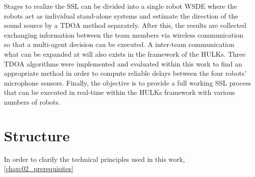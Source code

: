 Stages to realize the \ac{SSL} can be divided into a single robot \ac{WSDE} where
the robots act as individual stand-alone systems and estimate the direction of the
sound source by a \ac{TDOA} method separately.
After this, the results are collected exchanging information between the
team members via wireless communication so that a multi-agent decision can be executed.
A inter-team communication what can be expanded at will also exists in the framework of the HULKs.
Three \ac{TDOA} algorithms were implemented and evaluated within this work
to find an appropriate method in order to compute reliable delays between the four robots'
microphone sensors.
Finally, the objective is to provide a full working \ac{SSL} process that can be executed
in real-time within the HULKs framework with various numbers of robots.


\section{Structure}
\label{sec:01_Structure}

In order to clarify the technical principles used in this work, \cref{chap:02_prerequisites}

